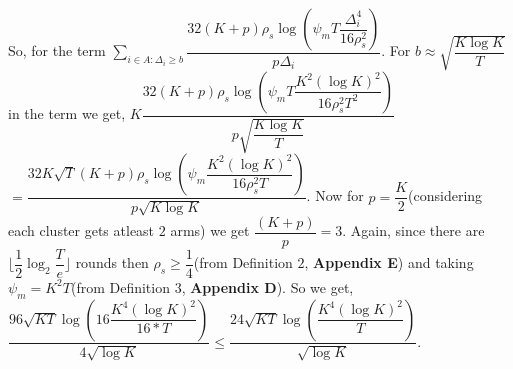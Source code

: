\begin{remark}
So, for the term $\sum_{i\in A:\Delta_{i}\geq b}\dfrac{32(K+p)\rho_{s}\log{(\psi_{m}T\dfrac{\Delta_{i}^{4}}{16\rho_{s}^{2}})}}{p\Delta_{i}}$. For $b\approx \sqrt{\dfrac{K\log K}{T}}$ in the term we get, $K\dfrac{32(K+p)\rho_{s}\log{(\psi_{m}T\dfrac{K^{2}(\log K)^{2}}{16\rho_{s}^{2}T^{2}})}}{p \sqrt{\dfrac{K\log K}{T}}}$\newline$=\dfrac{32K\sqrt{T}(K+p)\rho_{s}\log{(\psi_{m}\dfrac{K^{2}(\log K)^{2}}{16\rho_{s}^{2}T})}}{p \sqrt{K\log K}}$. Now for $p= \dfrac{K}{2}$(considering each cluster gets atleast $2$ arms) we get $\dfrac{(K+p)}{p}=  3$. Again, since there are $\big \lfloor \dfrac{1}{2}\log_{2} \dfrac{T}{e}\big\rfloor$ rounds then $\rho_{s}\geq \dfrac{1}{4}$(from Definition $2$, \textbf{Appendix E}) and taking $\psi_{m}=K^{2}T$(from Definition $3$, \textbf{Appendix D}). So we get, $\dfrac{96\sqrt{KT}\log{(16\dfrac{K^{4}(\log K)^{2}}{16*T})}}{4\sqrt{\log K}} \leq \dfrac{24\sqrt{KT}\log{(\dfrac{K^{4}(\log K)^{2}}{T})}}{\sqrt{\log K}}$.
\end{remark}



